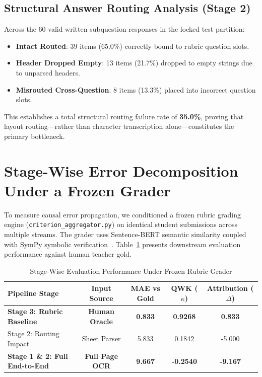 \documentclass[journal]{IEEEtran}
\begin{document}
\subsection{Structural Answer Routing Analysis (Stage 2)}
Across the 60 valid written subquestion responses in the locked test partition:
\begin{itemize}
    \item \textbf{Intact Routed}: 39 items (65.0\%) correctly bound to rubric question slots.
    \item \textbf{Header Dropped Empty}: 13 items (21.7\%) dropped to empty strings due to unparsed headers.
    \item \textbf{Misrouted Cross-Question}: 8 items (13.3\%) placed into incorrect question slots.
\end{itemize}
This establishes a total structural routing failure rate of \textbf{35.0\%}, proving that layout routing—rather than character transcription alone—constitutes the primary bottleneck.

\section{Stage-Wise Error Decomposition Under a Frozen Grader}
To measure causal error propagation, we conditioned a frozen rubric grading engine (\texttt{criterion\_aggregator.py}) on identical student submissions across multiple streams. The grader uses Sentence-BERT semantic similarity coupled with SymPy symbolic verification~\cite{meurer2017sympy}. Table~\ref{tab:grade_propagation} presents downstream evaluation performance against human teacher gold.

\begin{table}[htbp]
\centering
\caption{Stage-Wise Evaluation Performance Under Frozen Rubric Grader}
\label{tab:grade_propagation}
\begin{tabular}{lcccc}
\toprule
\textbf{Pipeline Stage} & \textbf{Input Source} & \textbf{MAE vs Gold} & \textbf{QWK ($\kappa$)} & \textbf{Attribution ($\Delta$)} \\
\midrule
\textbf{Stage 3: Rubric Baseline} & \textbf{Human Oracle} & \textbf{0.833} & \textbf{0.9268} & \textbf{0.833} \\
Stage 2: Routing Impact & Sheet Parser & 5.833 & 0.1842 & -5.000 \\
\textbf{Stage 1 \& 2: Full End-to-End} & \textbf{Full Page OCR} & \textbf{9.667} & \textbf{-0.2540} & \textbf{-9.167} \\
\bottomrule
\end{tabular}
\end{table}
\end{document}
